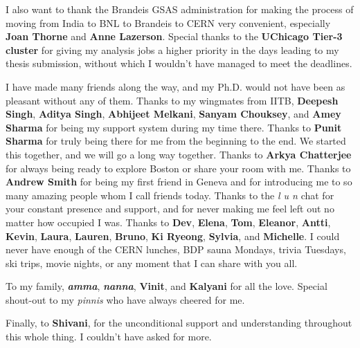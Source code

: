 I also want to thank the Brandeis GSAS administration for making the process of moving from India to BNL to Brandeis to CERN very convenient, especially \textbf{Joan Thorne} and \textbf{Anne Lazerson}. Special thanks to the \textbf{UChicago Tier-3 cluster} for giving my analysis jobs a higher priority in the days leading to my thesis submission, without which I wouldn't have managed to meet the deadlines.

I have made many friends along the way, and my Ph.D. would not have been as pleasant without any of them. Thanks to my wingmates from IITB, \textbf{Deepesh Singh}, \textbf{Aditya Singh}, \textbf{Abhijeet Melkani}, \textbf{Sanyam Chouksey}, and \textbf{Amey Sharma} for being my support system during my time there.
Thanks to \textbf{Punit Sharma} for truly being there for me from the beginning to the end. We started this together, and we will go a long way together. Thanks to \textbf{Arkya Chatterjee} for always being ready to explore Boston or share your room with me. Thanks to \textbf{Andrew Smith} for being my first friend in Geneva and for introducing me to so many amazing people whom I call friends today. Thanks to the \textit{l u n} chat for your constant presence and support, and for never making me feel left out no matter how occupied I was. Thanks to \textbf{Dev}, \textbf{Elena}, \textbf{Tom}, \textbf{Eleanor}, \textbf{Antti}, \textbf{Kevin}, \textbf{Laura}, \textbf{Lauren}, \textbf{Bruno}, \textbf{Ki Ryeong}, \textbf{Sylvia}, and \textbf{Michelle}. I could never have enough of the CERN lunches, BDP sauna Mondays, trivia Tuesdays, ski trips, movie nights, or any moment that I can share with you all.

To my family, \textbf{\textit{amma}}, \textbf{\textit{nanna}}, \textbf{Vinit}, and \textbf{Kalyani} for all the love. Special shout-out to my \textit{pinnis} who have always cheered for me.

Finally, to \textbf{Shivani}, for the unconditional support and understanding throughout this whole thing. I couldn't have asked for more.